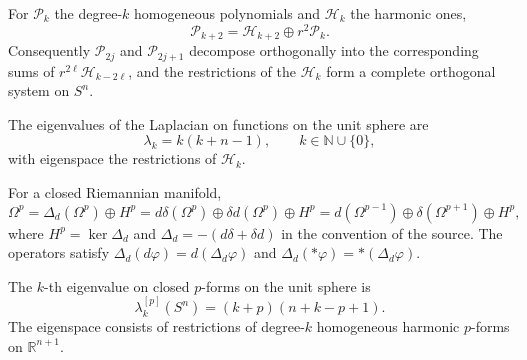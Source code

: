 \begin{proposition}
\label{prop:chow-iv-k19-harmonic-polynomial-decomposition}

For $\mathcal P_k$ the degree-$k$ homogeneous polynomials and $\mathcal H_k$
the harmonic ones,
\[
\mathcal P_{k+2}=\mathcal H_{k+2}\oplus r^2\mathcal P_k.
\]
Consequently $\mathcal P_{2j}$ and $\mathcal P_{2j+1}$ decompose orthogonally
into the corresponding sums of $r^{2\ell}\mathcal H_{k-2\ell}$, and the
restrictions of the $\mathcal H_k$ form a complete orthogonal system on $S^n$.
\end{proposition}

\begin{proposition}
\label{prop:chow-iv-k20-function-spectrum-sphere}


The eigenvalues of the Laplacian on functions on the unit sphere are
\[
\lambda_k=k(k+n-1),\qquad k\in\mathbb N\cup\{0\},
\]
with eigenspace the restrictions of $\mathcal H_k$.
\end{proposition}

\begin{theorem}
\label{thm:chow-iv-k21-hodge-decomposition}

For a closed Riemannian manifold,
\[
\Omega^p=\Delta_d(\Omega^p)\oplus H^p
=d\delta(\Omega^p)\oplus\delta d(\Omega^p)\oplus H^p
=d(\Omega^{p-1})\oplus\delta(\Omega^{p+1})\oplus H^p,
\]
where $H^p=\ker\Delta_d$ and $\Delta_d=-(d\delta+\delta d)$ in the
convention of the source.  The operators satisfy
$\Delta_d(d\varphi)=d(\Delta_d\varphi)$ and
$\Delta_d(*\varphi)=*(\Delta_d\varphi)$.
\end{theorem}

\begin{theorem}
\label{thm:chow-iv-k22-closed-eigenforms}


The $k$-th eigenvalue on closed $p$-forms on the unit sphere is
\[
\lambda_k^{[p]}(S^n)=(k+p)(n+k-p+1).
\]
The eigenspace consists of restrictions of degree-$k$ homogeneous harmonic
$p$-forms on $\mathbb R^{n+1}$.
\end{theorem}

